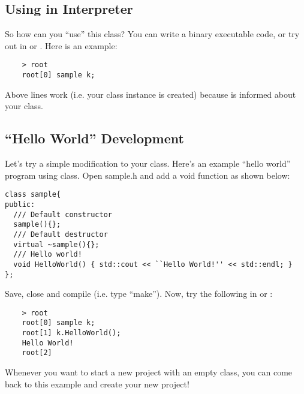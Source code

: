 \subsection{Using in Interpreter}

So how can you ``use'' this \CPP class? You can write a binary executable code, or try out in \CINT or \PyROOT. Here is an example:
\begin{lstlisting}
    > root
    root[0] sample k;
\end{lstlisting}
Above lines work (i.e. your class instance is created) because \CINT is informed about your class. 

\subsection{``Hello World'' Development}
\label{sec:helloworld}
Let's try a simple modification to your class. Here's an example ``hello world'' program using \CPP class. Open {\ttfamily sample.h} and add a {\ttfamily void} function as shown below:
\begin{lstlisting}
class sample{
public:
  /// Default constructor
  sample(){};
  /// Default destructor
  virtual ~sample(){};
  /// Hello world!
  void HelloWorld() { std::cout << ``Hello World!'' << std::endl; }
};
\end{lstlisting}
Save, close and compile (i.e. type ``make''). Now, try the following in \CINT or \PyROOT:
\begin{lstlisting}
    > root
    root[0] sample k;
    root[1] k.HelloWorld();
    Hello World!
    root[2]
\end{lstlisting}

Whenever you want to start a new project with an empty class, you can come back to this example and create your new \CPP project!



